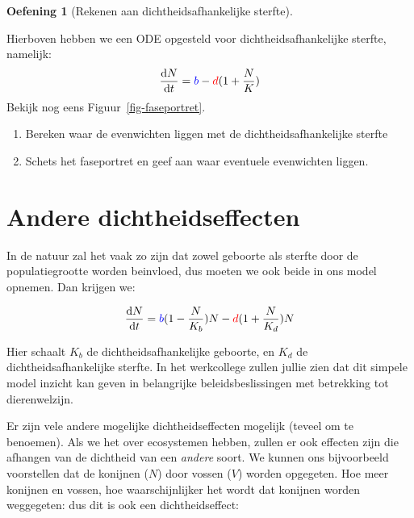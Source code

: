 \documentclass[
  a4paper,
]{scrbook}
\providecommand{\tightlist}{%
  \setlength{\itemsep}{0pt}\setlength{\parskip}{0pt}}\usepackage{longtable,booktabs,array}
\theoremstyle{definition}
\newtheorem{exercise}{Oefening}[chapter]
\theoremstyle{remark}
\begin{document}
\begin{exercise}[Rekenen aan dichtheidsafhankelijke
sterfte]\protect\hypertarget{exr-dddportrait}{}\label{exr-dddportrait}

Hierboven hebben we een ODE opgesteld voor dichtheidsafhankelijke
sterfte, namelijk: \[
\frac{\mathrm{d}N}{\mathrm{d}t} = \color{blue}b\color{black} - \color{red}d\color{black}(1+\frac{N}{K})
\] Bekijk nog eens Figuur~\ref{fig-faseportret}.

\begin{enumerate}
\def\labelenumi{\alph{enumi}.}
\tightlist
\item
  Bereken waar de evenwichten liggen met de dichtheidsafhankelijke
  sterfte
\item
  Schets het faseportret en geef aan waar eventuele evenwichten liggen.
\end{enumerate}

\end{exercise}

\hypertarget{andere-dichtheidseffecten}{%
\section{Andere dichtheidseffecten}\label{andere-dichtheidseffecten}}

In de natuur zal het vaak zo zijn dat zowel geboorte als sterfte door de
populatiegrootte worden beinvloed, dus moeten we ook beide in ons model
opnemen. Dan krijgen we:

\begin{align}
    \frac{\mathrm{d}N}{\mathrm{d}t} &= \color{blue}b\color{black}(1-\frac{N}{K_b})N - \color{red}d\color{black}(1+\frac{N}{K_d})N\\
\end{align}

Hier schaalt \(K_b\) de dichtheidsafhankelijke geboorte, en \(K_d\) de
dichtheidsafhankelijke sterfte. In het werkcollege zullen jullie zien
dat dit simpele model inzicht kan geven in belangrijke
beleidsbeslissingen met betrekking tot dierenwelzijn.

Er zijn vele andere mogelijke dichtheidseffecten mogelijk (teveel om te
benoemen). Als we het over ecosystemen hebben, zullen er ook effecten
zijn die afhangen van de dichtheid van een \emph{andere} soort. We
kunnen ons bijvoorbeeld voorstellen dat de konijnen (\(N\)) door vossen
(\(V\)) worden opgegeten. Hoe meer konijnen en vossen, hoe
waarschijnlijker het wordt dat konijnen worden weggegeten: dus dit is
ook een dichtheidseffect:
\end{document}
